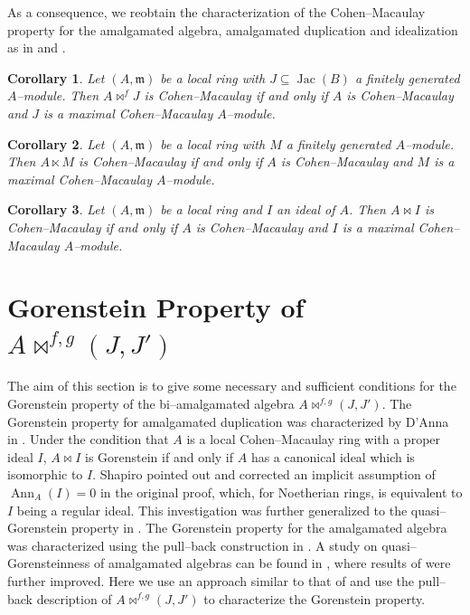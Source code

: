 \documentclass{amsart}%
\theoremstyle{plain}
\newtheorem{corollary}{Corollary}[section]
\numberwithin{equation}{section}
\theoremstyle{definition}
\DeclareMathOperator{\jac}{Jac}
\DeclareMathOperator{\Ann}{Ann}
\begin{document}
As a consequence, we reobtain the characterization of the Cohen--Macaulay property for the amalgamated algebra, amalgamated duplication and idealization as in \cite{DFF3} and \cite{Gorenstein}.

\begin{corollary}
    Let $(A,\mathfrak{m})$ be a local ring with $J\subseteq \jac(B)$ a finitely generated $A$--module. Then $A\bowtie^f J$ is Cohen--Macaulay if and only if $A$ is Cohen--Macaulay and $J$ is a maximal Cohen--Macaulay $A$--module.
\end{corollary}
\begin{corollary}
    Let $(A,\mathfrak{m})$ be a local ring with $M$ a finitely generated $A$--module. Then $A\ltimes M$ is Cohen--Macaulay if and only if $A$ is Cohen--Macaulay and $M$ is a maximal Cohen--Macaulay $A$--module.
\end{corollary}
\begin{corollary}
     Let $(A,\mathfrak{m})$ be a local ring and $I$ an ideal of $A$. Then $A\bowtie I$ is Cohen--Macaulay if and only if $A$ is Cohen--Macaulay and $I$ is a maximal Cohen--Macaulay $A$--module.
\end{corollary}



\section{Gorenstein Property of $A\bowtie^{f,g}(J,J')$}

The aim of this section is to give some necessary and sufficient conditions for the Gorenstein property of the bi--amalgamated algebra $A\bowtie^{f,g}(J,J')$. The Gorenstein property for amalgamated duplication was characterized by D'Anna in \cite{Gorenstein}. Under the condition that $A$ is a local Cohen--Macaulay ring with a proper ideal $I$, $A\bowtie I$ is Gorenstein if and only if $A$ has a canonical ideal which is isomorphic to $I$. Shapiro \cite{Shapiro} pointed out and corrected an implicit assumption of $\Ann_A(I)=0$ in the original proof, which, for Noetherian rings, is equivalent to $I$ being a regular ideal. This investigation was further generalized to the quasi--Gorenstein property in \cite{quasigorenstein}. The Gorenstein property for the amalgamated algebra was characterized using the pull--back construction in \cite{DFF3}. A study on quasi--Gorensteinness of amalgamated algebras can be found in \cite{iranlilar}, where results of \cite{DFF3} were further improved. Here we use an approach similar to that of \cite{DFF3} and use the pull--back description of $A\bowtie^{f,g}(J,J')$ to characterize the Gorenstein property.\medskip
\end{document}
